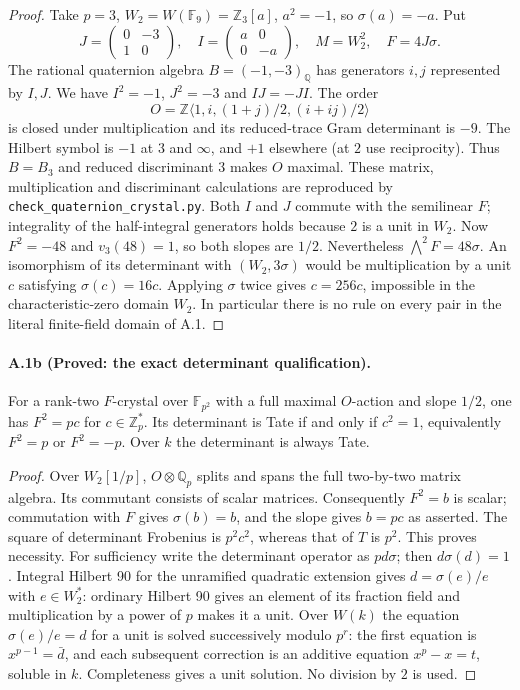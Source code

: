 \begin{proof}
Take $p=3$, $W_2=W(\mathbb F_9)=\mathbb Z_3[a]$, $a^2=-1$, so
$\sigma(a)=-a$. Put
\[
 J=\begin{pmatrix}0&-3\\1&0\end{pmatrix},\quad
 I=\begin{pmatrix}a&0\\0&-a\end{pmatrix},\quad
 M=W_2^2,\quad F=4J\sigma.
\]
The rational quaternion algebra $B=(-1,-3)_{\mathbb Q}$ has generators
$i,j$ represented by $I,J$. We have $I^2=-1$, $J^2=-3$ and $IJ=-JI$.
The order
\[
 O=\mathbb Z\langle 1,i,(1+j)/2,(i+ij)/2\rangle
\]
is closed under multiplication and its reduced-trace Gram determinant is
$-9$. The Hilbert symbol is $-1$ at $3$ and $\infty$, and $+1$ elsewhere
(at $2$ use reciprocity). Thus $B=B_3$ and reduced discriminant $3$
makes $O$ maximal. These matrix, multiplication and discriminant
calculations are reproduced by \texttt{check\_quaternion\_crystal.py}.
Both $I$ and $J$ commute with the semilinear $F$; integrality of the
half-integral generators holds because $2$ is a unit in $W_2$.
Now $F^2=-48$ and $v_3(48)=1$, so both slopes are $1/2$.
Nevertheless $\bigwedge^2F=48\sigma$. An isomorphism of its determinant
with $(W_2,3\sigma)$ would be multiplication by a unit $c$ satisfying
$\sigma(c)=16c$. Applying $\sigma$ twice gives $c=256c$, impossible in
the characteristic-zero domain $W_2$. In particular there is no rule on
every pair in the literal finite-field domain of A.1.
\end{proof}

\paragraph{A.1b (Proved: the exact determinant qualification).}
For a rank-two $F$-crystal over $\mathbb F_{p^2}$ with a full maximal
$O$-action and slope $1/2$, one has $F^2=pc$ for $c\in\mathbb Z_p^*$.
Its determinant is Tate if and only if $c^2=1$, equivalently $F^2=p$ or
$F^2=-p$. Over $k$ the determinant is always Tate.

\begin{proof}
Over $W_2[1/p]$, $O\otimes\mathbb Q_p$ splits and spans the full
two-by-two matrix algebra. Its commutant consists of scalar matrices.
Consequently $F^2=b$ is scalar; commutation with $F$ gives
$\sigma(b)=b$, and the slope gives $b=pc$ as asserted. The square of
determinant Frobenius is $p^2c^2$, whereas that of $T$ is $p^2$.
This proves necessity. For sufficiency write the determinant operator
as $pd\sigma$; then $d\sigma(d)=1$. Integral Hilbert 90 for the
unramified quadratic extension gives $d=\sigma(e)/e$ with
$e\in W_2^*$: ordinary Hilbert 90 gives an element of its fraction
field and multiplication by a power of $p$ makes it a unit.
Over $W(k)$ the equation $\sigma(e)/e=d$ for a unit is solved successively
modulo $p^r$: the first equation is $x^{p-1}=\bar d$, and each subsequent
correction is an additive equation $x^p-x=t$, soluble in $k$.
Completeness gives a unit solution. No division by $2$ is used.
\end{proof}

